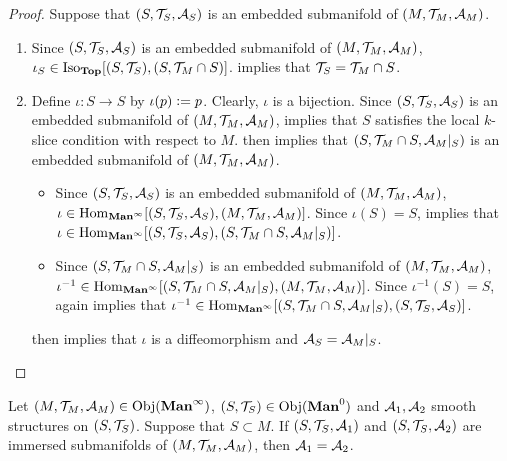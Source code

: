 \documentclass{book}
\begin{document}
	\begin{proof}
		Suppose that $(S, \mathcal{T}_S, \mathcal{A}_S)$ is an embedded submanifold of $(M, \mathcal{T}_M, \mathcal{A}_M)$. 
		\begin{enumerate}
			\item Since $(S, \mathcal{T}_S, \mathcal{A}_S)$ is an embedded submanifold of $(M, \mathcal{T}_M, \mathcal{A}_M)$, $\iota_S \in \operatorname{Iso}_{\operatorname*{\text{\textbf{Top}}}}[(S, \mathcal{T}_S), (S, \mathcal{T}_M \cap S)]$.  implies that $\mathcal{T}_S = \mathcal{T}_M \cap S$. 
			\item Define $\iota:S \rightarrow S$ by $\iota(p) \vcentcolon= p$. Clearly, $\iota$ is a bijection. Since $(S, \mathcal{T}_S, \mathcal{A}_S)$ is an embedded submanifold of $(M, \mathcal{T}_M, \mathcal{A}_M)$,  implies that $S$ satisfies the local $k$-slice condition with respect to $M$.  then implies that $(S, \mathcal{T}_M \cap S, \mathcal{A}_M|_S)$ is an embedded submanifold of $(M, \mathcal{T}_M, \mathcal{A}_M)$.
			\begin{itemize}
				\item Since $(S, \mathcal{T}_S, \mathcal{A}_S)$ is an embedded submanifold of $(M, \mathcal{T}_M, \mathcal{A}_M)$, $\iota \in \operatorname{Hom}_{\operatorname*{\text{\textbf{Man}}^{\infty}}}[(S, \mathcal{T}_S, \mathcal{A}_S), (M, \mathcal{T}_M, \mathcal{A}_M)]$. Since $\iota(S) = S$,  implies that $\iota \in \operatorname{Hom}_{\operatorname*{\text{\textbf{Man}}^{\infty}}}[(S, \mathcal{T}_S, \mathcal{A}_S), (S, \mathcal{T}_M \cap S, \mathcal{A}_M|_S)]$. 
				\item Since $(S, \mathcal{T}_M \cap S, \mathcal{A}_M|_S)$ is an embedded submanifold of $(M, \mathcal{T}_M, \mathcal{A}_M)$, $\iota^{-1} \in \operatorname{Hom}_{\operatorname*{\text{\textbf{Man}}^{\infty}}}[(S, \mathcal{T}_M \cap S, \mathcal{A}_M|_S), (M, \mathcal{T}_M, \mathcal{A}_M)]$. Since $\iota^{-1}(S) = S$,  again implies that $\iota^{-1} \in \operatorname{Hom}_{\operatorname*{\text{\textbf{Man}}^{\infty}}}[(S, \mathcal{T}_M \cap S, \mathcal{A}_M|_S), (S, \mathcal{T}_S, \mathcal{A}_S)]$. 
			\end{itemize}
			 then implies that $\iota$ is a diffeomorphism and $\mathcal{A}_S = \mathcal{A}_M|_S$. 
		\end{enumerate}
	\end{proof}

	\begin{ex}  
		Let $(M, \mathcal{T}_M, \mathcal{A}_M) \in \operatorname{Obj}(\operatorname*{\text{\textbf{Man}}^{\infty}})$, $(S, \mathcal{T}_S) \in \operatorname{Obj}(\operatorname*{\text{\textbf{Man}}^0})$ and $\mathcal{A}_1, \mathcal{A}_2$ smooth structures on $(S, \mathcal{T}_S)$. Suppose that $S \subset M$. If $(S, \mathcal{T}_S, \mathcal{A}_1)$ and $(S, \mathcal{T}_S, \mathcal{A}_2)$ are immersed submanifolds of $(M, \mathcal{T}_M, \mathcal{A}_M)$, then $\mathcal{A}_1 = \mathcal{A}_2$. 
	\end{ex}
	
\end{document}
